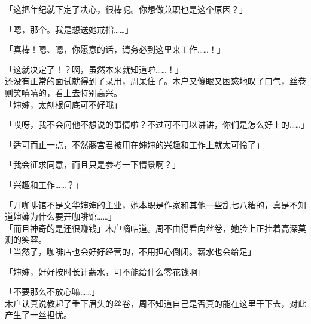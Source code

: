 「这把年纪就下定了决心，很棒呢。你想做兼职也是这个原因？」

「嗯，那个。我是想送她戒指……」

「真棒！嗯、嗯，你愿意的话，请务必到这里来工作……！」

「这就决定了！？啊，虽然本来就知道啦……！」\\

还没有正常的面试就得到了录用，周呆住了。木户又傻眼又困惑地叹了口气，丝卷则笑嘻嘻的，看上去特别高兴。\\

「婶婶，太刨根问底可不好哦」

「哎呀，我不会问他不想说的事情啦？不过可不可以讲讲，你们是怎么好上的……」

「适可而止一点，不然藤宫君被用在婶婶的兴趣和工作上就太可怜了」

「我会征求同意，而且只是参考一下情景啊？」

「兴趣和工作……？」

「开咖啡馆不是文华婶婶的主业，她本职是作家和其他一些乱七八糟的，真是不知道婶婶为什么要开咖啡馆……」\\

「而且神奇的是还很赚钱」木户嘀咕道。周不由得看向丝卷，她脸上正挂着高深莫测的笑容。\\

「当然了，咖啡店也会好好经营的，不用担心倒闭。薪水也会给足」

「婶婶，好好按时长计薪水，可不能给什么零花钱啊」

「不要那么不放心嘛……」\\

木户认真说教起了垂下眉头的丝卷，周不知道自己是否真的能在这里干下去，对此产生了一丝担忧。
